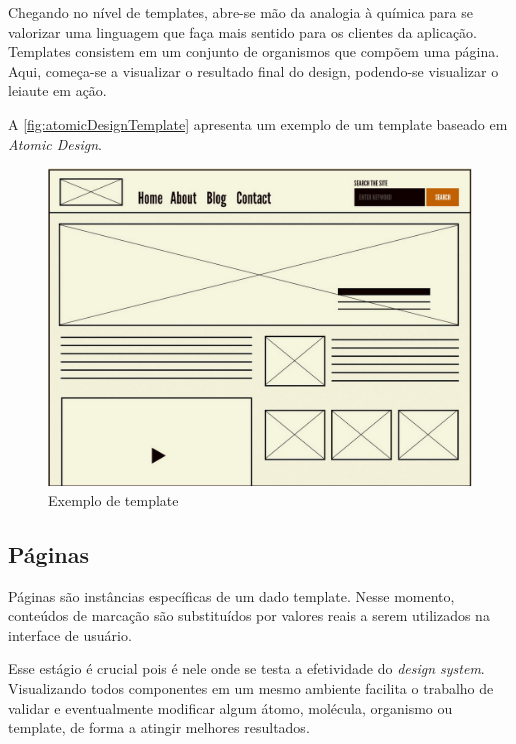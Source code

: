 Chegando no nível de templates, abre-se mão da analogia à química para se valorizar uma linguagem que faça mais sentido para os clientes da aplicação. Templates consistem em um conjunto de organismos que compõem uma página. Aqui, começa-se a visualizar o resultado final do design, podendo-se visualizar o leiaute em ação.

A \autoref{fig:atomicDesignTemplate} apresenta um exemplo de um template baseado em \textit{Atomic Design}.

\begin{figure}
	\includegraphics[width=\linewidth]{./04-figuras/02_referencial_teorico/ad-template.png}
	\caption{Exemplo de template}
  \label{fig:atomicDesignTemplate}
\end{figure}

\subsection{Páginas}

Páginas são instâncias específicas de um dado template. Nesse momento, conteúdos de marcação são substituídos por valores reais a serem utilizados na interface de usuário.

Esse estágio é crucial pois é nele onde se testa a efetividade do \textit{design system}. Visualizando todos componentes em um mesmo ambiente facilita o trabalho de validar e eventualmente modificar algum átomo, molécula, organismo ou template, de forma a atingir melhores resultados.

